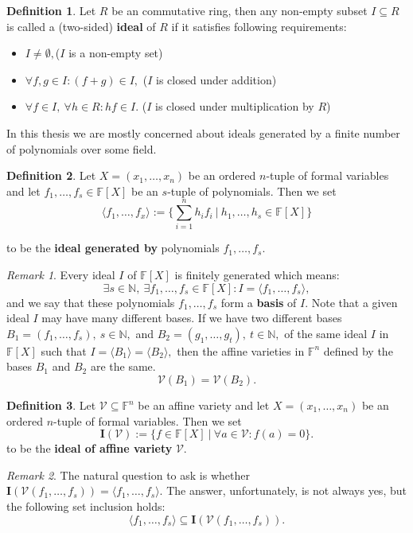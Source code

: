 \documentclass[thesis=M,english]{FITthesis}[2012/10/20]
\theoremstyle{remark}
\newtheorem*{RM}{Remark}
\theoremstyle{definition}
\newtheorem{DF}{Definition}[section]
\begin{document}
 \begin{DF}
Let $R$ be an commutative ring, then any non-empty subset $I \subseteq R$ is called a (two-sided) \textbf{ideal} of $R$ if it satisfies following requirements:
\begin{itemize}
\item $I \neq \emptyset,$\hfill ($I$ is a non-empty set)
\item $\forall f,g \in I: (f + g) \in I,$ \hfill ($I$ is closed under addition)
\item $\forall f \in I,\ \forall h \in R: hf \in I.$ \hfill ($I$ is closed under multiplication by $R$)
\end{itemize}
\end{DF}
\noindent In this thesis we are mostly concerned about ideals generated by a finite number of polynomials over some field.
\begin{DF}
Let $X = (x_1, \ldots ,x_n)$ be an ordered $n$-tuple of formal variables and let $f_1,\ldots,f_s \in \mathbb{F}[X] $ be an $s$-tuple of polynomials. Then we set
$$
\langle f_1, \ldots, f_x \rangle := \{ \sum_{i=1}^n h_if_i\ |\ h_1,\ldots,h_s \in \mathbb{F}[X]\}
$$
\end{DF}
\noindent to be the \textbf{ideal generated by} polynomials $f_1,\ldots,f_s$.
\begin{RM}
Every ideal $I$ of $\mathbb{F}[X]$ is finitely generated which means:
$$
\exists s \in \mathbb{N},\ \exists f_1,\ldots,f_s \in \mathbb{F}[X]: I = \langle f_1, \ldots, f_s \rangle,
$$
\noindent and we say that these polynomials $f_1,\ldots,f_s$ form a \textbf{basis} of $I$. Note that a given ideal $I$ may have many different bases. If we have two different bases $B_1 = (f_1,\ldots,f_s),\ s \in \mathbb{N},$ and $B_2 = (g_1, \ldots, g_t),\ t \in \mathbb{N},$ of the same ideal $I$ in $\mathbb{F}[X]$ such that $I = \langle B_1\rangle = \langle B_2 \rangle,$ then the affine varieties in $\mathbb{F}^n$ defined by the bases $B_1$ and $B_2$ are the same.
$$
\mathcal{V}(B_1) = \mathcal{V}(B_2).
$$
\end{RM}
\begin{DF}
Let $\mathcal{V} \subseteq \mathbb{F}^n$ be an affine variety and let $X = (x_1, \ldots ,x_n)$ be an ordered $n$-tuple of formal variables. Then we set 
$$
\mathbf{I}(\mathcal{V}) := \{ f \in \mathbb{F}[X]\ |\ \forall a \in \mathcal{V}: f(a) = 0\}.
$$
\noindent to be the \textbf{ideal of affine variety} $\mathcal{V}$.
\end{DF}
\begin{RM}
The natural question to ask is whether $\mathbf{I}(\mathcal{V}(f_1,\ldots,f_s)) = \langle f_1,\ldots,f_s \rangle.$ The answer, unfortunately, is not always yes, but the following set inclusion holds:
$$
\langle f_1,\ldots,f_s \rangle \subseteq \mathbf{I}(\mathcal{V}(f_1,\ldots,f_s)) .
$$
\end{RM} 
\end{document}
